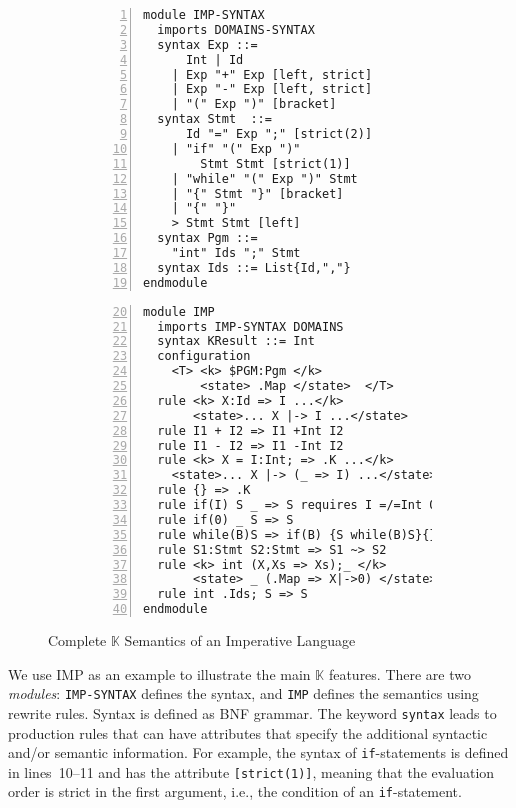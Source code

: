\documentclass{article}
\theoremstyle{plain}
\theoremstyle{definition}
\newcommand{\K}{$\mathbb{K}$\xspace}
\newcommand{\code}[1]{\texttt{#1}\xspace}
\begin{document}
\begin{figure}[t]
\begin{subfigure}[t]{0.45\textwidth}
\begin{lstlisting}[language=K,numbers=left,frame=single,framexleftmargin=1em]
module IMP-SYNTAX
  imports DOMAINS-SYNTAX
  syntax Exp ::= 
      Int | Id
    | Exp "+" Exp [left, strict]
    | Exp "-" Exp [left, strict]
    | "(" Exp ")" [bracket]
  syntax Stmt  ::=
      Id "=" Exp ";" [strict(2)]
    | "if" "(" Exp ")"
        Stmt Stmt [strict(1)]
    | "while" "(" Exp ")" Stmt
    | "{" Stmt "}" [bracket]
    | "{" "}"
    > Stmt Stmt [left]
  syntax Pgm ::= 
    "int" Ids ";" Stmt 
  syntax Ids ::= List{Id,","}
endmodule
\end{lstlisting}
\end{subfigure}
\begin{subfigure}[t]{0.57\textwidth}
\begin{lstlisting}[language=K,numbers=left,firstnumber=20,xleftmargin=1em,frame=single,framexleftmargin=1em]
module IMP 
  imports IMP-SYNTAX DOMAINS
  syntax KResult ::= Int
  configuration 
    <T> <k> $PGM:Pgm </k>
        <state> .Map </state>  </T>
  rule <k> X:Id => I ...</k> 
       <state>... X |-> I ...</state>
  rule I1 + I2 => I1 +Int I2
  rule I1 - I2 => I1 -Int I2
  rule <k> X = I:Int; => .K ...</k> 
    <state>... X |-> (_ => I) ...</state>
  rule {} => .K
  rule if(I) S _ => S requires I =/=Int 0
  rule if(0) _ S => S
  rule while(B)S => if(B) {S while(B)S}{}
  rule S1:Stmt S2:Stmt => S1 ~> S2
  rule <k> int (X,Xs => Xs);_ </k> 
       <state> _ (.Map => X|->0) </state>
  rule int .Ids; S => S
endmodule
\end{lstlisting}
\end{subfigure}
\caption{Complete \K Semantics of  an Imperative Language}
\label{fig:imp}
\end{figure}



We use IMP as an example to illustrate the main \K features.
There are two \emph{modules}:
\code{IMP-SYNTAX} defines the syntax, and \code{IMP}
defines the semantics using rewrite rules. 
Syntax is defined as BNF grammar.
The keyword \code{syntax} leads to production rules
that can have {attributes} that specify the additional 
syntactic and/or semantic information.
For example, the syntax of \code{if}-statements is defined in lines~10--11
and has the attribute \code{[strict(1)]}, meaning that the evaluation order 
is strict in the first argument, i.e., the condition of an \code{if}-statement.
\end{document}
